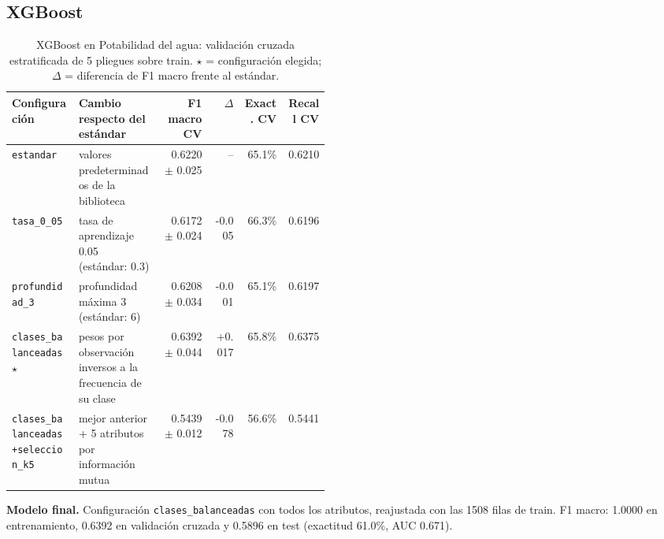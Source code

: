 \documentclass[11pt]{article}
\begin{document}
\FloatBarrier

\subsection{XGBoost}

\begin{table}[H]\centering\footnotesize
\caption{XGBoost en Potabilidad del agua: validación cruzada estratificada de 5 pliegues sobre train. $\star$ = configuración elegida; $\Delta$ = diferencia de F1 macro frente al estándar.}
\begin{tabular}{>{\raggedright\arraybackslash}p{0.21\linewidth}>{\raggedright\arraybackslash}p{0.26\linewidth}rrrr}\toprule
Configuración & Cambio respecto del estándar & F1 macro CV & $\Delta$ & Exact. CV & Recall CV \\ \midrule
\texttt{estandar} & valores predeterminados de la biblioteca & 0.6220 $\pm$ 0.025 & -- & 65.1\% & 0.6210 \\
\texttt{tasa\_\allowbreak{}0\_\allowbreak{}05} & tasa de aprendizaje 0.05 (estándar: 0.3) & 0.6172 $\pm$ 0.024 & -0.005 & 66.3\% & 0.6196 \\
\texttt{profundidad\_\allowbreak{}3} & profundidad máxima 3 (estándar: 6) & 0.6208 $\pm$ 0.034 & -0.001 & 65.1\% & 0.6197 \\
\texttt{clases\_\allowbreak{}balanceadas} $\star$ & pesos por observación inversos a la frecuencia de su clase & 0.6392 $\pm$ 0.044 & +0.017 & 65.8\% & 0.6375 \\
\texttt{clases\_\allowbreak{}balanceadas+\allowbreak{}seleccion\_\allowbreak{}k5} & mejor anterior + 5 atributos por información mutua & 0.5439 $\pm$ 0.012 & -0.078 & 56.6\% & 0.5441 \\
\bottomrule\end{tabular}
\end{table}

\textbf{Modelo final.} Configuración \texttt{clases\_\allowbreak{}balanceadas} con todos los atributos, reajustada con las 1508 filas de train. F1 macro: 1.0000 en entrenamiento, 0.6392 en validación cruzada y 0.5896 en test (exactitud 61.0\%, AUC 0.671).
\end{document}
